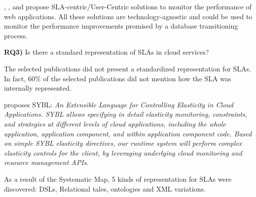 \documentclass{article}
\begin{document}
\cite{6253526}, \cite{6461875}, \cite{6511780} and \cite{Xiong:2011:APA:2038916.2038931} propose SLA-centric/User-Centric solutions to monitor the performance of web applications. All these solutions are technology-agnostic and could be used to monitor the performance improvements promised by a database transitioning process.

\textbf{RQ3)} Is there a standard representation of SLAs in cloud services? 

The selected publications did not present a standardized representation for SLAs. In fact, 60\% of the selected publications did not mention how the SLA was internally represented. 

\cite{6546068} proposes SYBL: \textit{An Extensible Language for Controlling Elasticity in Cloud Applications. SYBL allows specifying in detail elasticity monitoring, constraints, and strategies at different levels of cloud applications, including the whole application, application component, and within application component code. Based on simple SYBL elasticity directives, our runtime system will perform complex elasticity controls for the client, by leveraging underlying cloud monitoring and resource management APIs.}

As a result of the Systematic Map, 5 kinds of representation for SLAs were discovered: DSLs, Relational tales, ontologies and XML variations.



	
\end{document}
